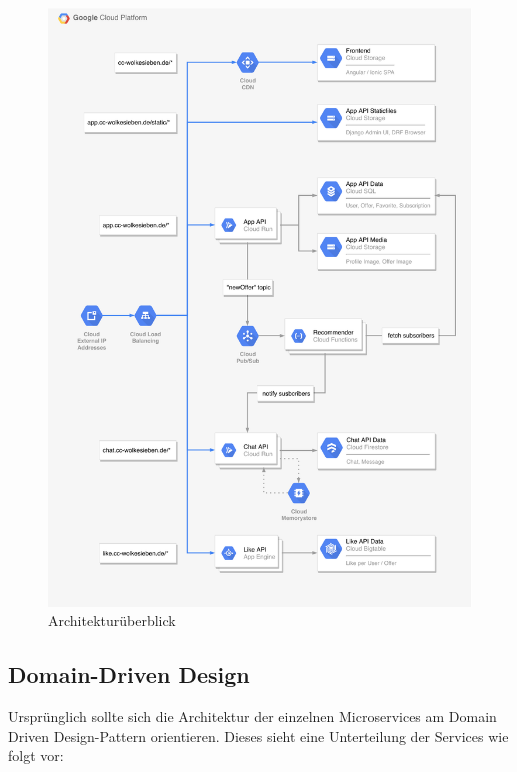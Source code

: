 \documentclass{article}
\begin{document}
\begin{figure}[H]
\centering
\label{fig:architecture}
\includegraphics[width=\textwidth]{images/gcp-architecture}
\caption{Architekturüberblick}
\end{figure}



\subsection{Domain-Driven Design}

Ursprünglich sollte sich die Architektur der einzelnen Microservices am Domain Driven Design-Pattern orientieren. Dieses sieht eine Unterteilung der Services wie folgt vor:
\end{document}
